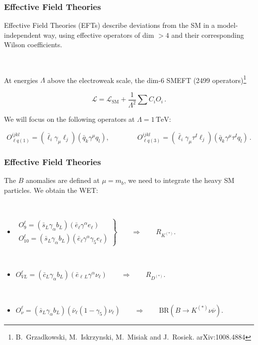 \documentclass[mathserif, 10pt]{beamer}
\begin{document}
\begin{frame}
  \frametitle{Effective Field Theories}

  Effective Field Theories (EFTs) describe deviations from the SM in a model-independent way, using effective operators of dim $>4$ and their corresponding Wilson coefficients.

  ~

  At energies $\Lambda$ above the electroweak scale, the dim-6 SMEFT (2499 operators)\footnote[1]{B.~Grzadkowski, M.~Iskrzynski, M.~Misiak and J.~Rosiek. arXiv:1008.4884}

  $$\mathcal{L} = \mathcal{L}_\mathrm{SM} + \frac{1}{\Lambda^2}\sum C_i O_i\,.$$

  We will focus on the following operators at $\Lambda = 1\,\mathrm{TeV}$:

  $$O_{\ell q(1)}^{ijkl} = (\bar{\ell}_i \gamma_\mu \ell_j)(\bar{q}_k \gamma^\mu  q_l),\qquad\qquad O_{\ell q(3)}^{ijkl}= (\bar{\ell}_i \gamma_\mu \tau^I \ell_j)(\bar{q}_k \gamma^\mu \tau^I q_l)\,.$$

\end{frame}

\begin{frame}

  \frametitle{Effective Field Theories}
  The $B$ anomalies are defined at $\mu=m_b$, we need to integrate the heavy SM particles. We obtain the WET\@:

  ~

  \begin{itemize}
    \item $\left.\begin{matrix}
              O_9^\ell = (\bar{s}_L \gamma_\alpha b_L)(\bar{e}_\ell \gamma^\alpha e_\ell) \\
              O_{10}^\ell = (\bar{s}_L \gamma_\alpha b_L)(\bar{e}_\ell \gamma^\alpha \gamma_5 e_\ell)
            \end{matrix}\right\} \qquad \Longrightarrow \qquad R_{K^{(*)}}$. %

          ~

    \item $O_{VL}^\ell = (\bar{c}_L \gamma_\alpha b_L)(\bar{e}_{\ell\,L} \gamma^\alpha \nu_\ell) \qquad\Longrightarrow\qquad R_{D^{(*)}}$.

          ~

    \item $O_\nu^\ell = (\bar{s}_L \gamma_\alpha b_L)(\bar{\nu}_\ell (1-\gamma_5) \nu_\ell) \qquad\Longrightarrow \qquad \mathrm{BR}(B\to K^{(*)}\nu\overline{\nu})$.
  \end{itemize}



\end{frame}
\end{document}
